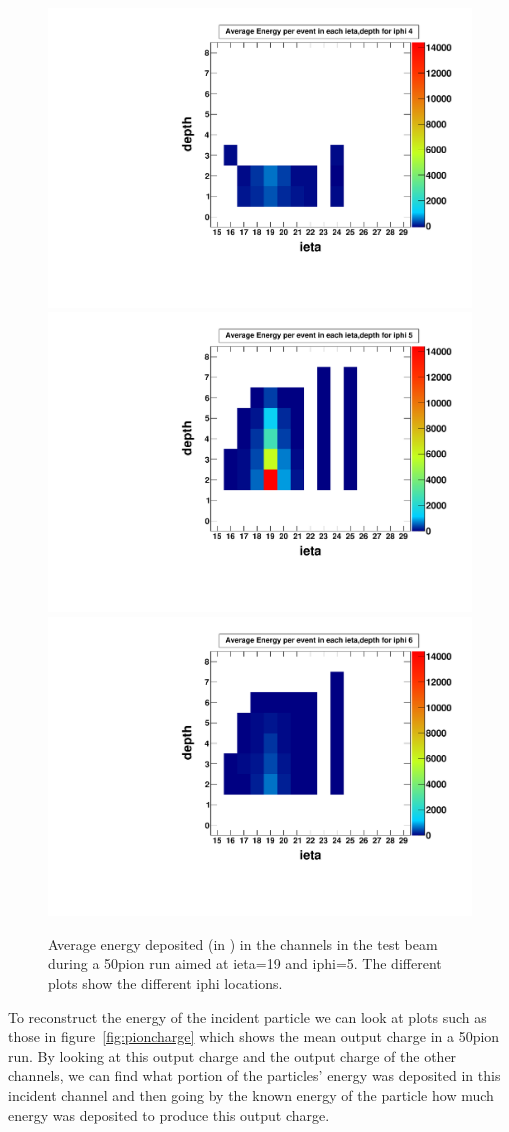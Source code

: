\begin{figure}
\centering
\includegraphics[width=0.495\linewidth]{Figures/pionrun1.pdf}
\includegraphics[width=0.495\linewidth]{Figures/pionrun.pdf}
\includegraphics[width=0.495\linewidth]{Figures/pionrun2.pdf}
\caption{Average energy deposited (in \MeV) in the channels in the test beam during a 50\GeV\space pion run aimed at ieta=19 and iphi=5. The different plots show the different iphi locations.}
\label{fig:pionmap}
\end{figure}

To reconstruct the energy of the incident particle we can look at plots such as those in figure~\ref{fig:pioncharge} which shows the mean output charge in a 50\GeV\space pion run. By looking at this output charge and the output charge of the other channels, we can find what portion of the particles' energy was deposited in this incident channel and then going by the known energy of the particle how much energy was deposited to produce this output charge. 

